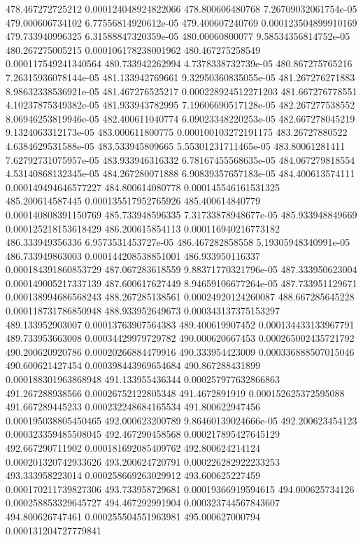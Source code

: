 {478.467272725212 0.000124048924822066
478.800606480768 7.26709032061754e-05
479.000606734102 6.77556814920612e-05
479.400607240769 0.000123504899910169
479.733940996325 6.31588847320359e-05
480.00060800077 9.58534356814752e-05
480.267275005215 0.000106178238001962
480.467275258549 0.000117549241340564
480.733942262994 4.7378338732739e-05
480.867275765216 7.26315936078144e-05
481.133942769661 9.32950360835055e-05
481.267276271883 8.98632338536921e-05
481.467276525217 0.000228924512271203
481.667276778551 4.10237875349382e-05
481.933943782995 7.19606690517128e-05
482.267277538552 8.06946253819946e-05
482.400611040774 6.09023348220253e-05
482.667278045219 9.1324063312173e-05
483.000611800775 0.000100103272191175
483.26727880522 4.6384629531588e-05
483.533945809665 5.55301231711465e-05
483.80061281411 7.62792731075957e-05
483.933946316332 6.78167455568635e-05
484.067279818554 4.53140868132345e-05
484.267280071888 6.90839357657183e-05
484.400613574111 0.000149494646577227
484.800614080778 0.000145546161531325
485.200614587445 0.000135517952765926
485.400614840779 0.000140808391150769
485.733948596335 7.31733878948677e-05
485.933948849669 0.000125218153618429
486.200615854113 0.000116940216773182
486.333949356336 6.9573531453727e-05
486.467282858558 5.19305948340991e-05
486.733949863003 0.000144208538851001
486.933950116337 0.000184391860853729
487.067283618559 9.88371770321796e-05
487.333950623004 0.000149005217337139
487.600617627449 8.94659106677264e-05
487.733951129671 0.000138994686568243
488.267285138561 0.00024920124260087
488.667285645228 0.000118731786850948
488.933952649673 0.000343137375153297
489.133952903007 0.00013763907564383
489.400619907452 0.000134433133967791
489.733953663008 0.00034429979729782
490.000620667453 0.000265002435721792
490.200620920786 0.00020266884479916
490.333954423009 0.000336888507015046
490.600621427454 0.000398443969654684
490.867288431899 0.000188301963868948
491.133955436344 0.000257977632866863
491.267288938566 0.00026752122805348
491.4672891919 0.000152625372595088
491.667289445233 0.000232248684165534
491.800622947456 0.000195038805450465
492.000623200789 9.86460139024666e-05
492.200623454123 0.000323359485508045
492.467290458568 0.000217895427645129
492.667290711902 0.000181692085409762
492.800624214124 0.000201320742933626
493.200624720791 0.000226282922233253
493.333958223014 0.000258669263029912
493.600625227459 0.000170211739827306
493.733958729681 0.00019366919594615
494.000625734126 0.000258853329645727
494.467292991904 0.000323744567843607
494.800626747461 0.000255504551963981
495.000627000794 0.000131204727779841
}
